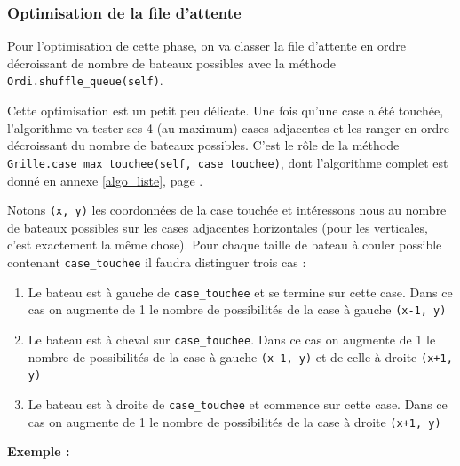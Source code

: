 \subsubsection{Optimisation de la file d'attente}

Pour l'optimisation de cette phase, on va classer la file d'attente en ordre décroissant de nombre de bateaux possibles avec la méthode \texttt{Ordi.shuffle\_queue(self)}.
 
Cette optimisation est un petit peu délicate. Une fois qu'une case a été touchée, l'algorithme va tester ses 4 (au maximum) cases adjacentes et les ranger en ordre décroissant du nombre de bateaux possibles. C'est le rôle de la méthode \texttt{Grille.case\_max\_touchee(self, case\_touchee)}, dont l'algorithme complet est donné en annexe \ref{algo_liste}, page \pageref{case_max_touchee}. 

\medskip

Notons \texttt{(x, y)} les coordonnées de la case touchée et intéressons nous au nombre de bateaux possibles sur les cases adjacentes horizontales (pour les verticales, c'est exactement la même chose). Pour chaque taille de bateau à couler possible contenant \texttt{case\_touchee} il faudra distinguer trois cas :
\begin{enumerate}
\item Le bateau est à gauche de \texttt{case\_touchee} et se termine sur cette case. Dans ce cas on augmente de 1 le nombre de possibilités de la case à gauche \texttt{(x-1, y)}
\item Le bateau est à cheval sur \texttt{case\_touchee}. Dans ce cas on augmente de 1 le nombre de possibilités de la case à gauche \texttt{(x-1, y)} et de celle à droite \texttt{(x+1, y)}
\item Le bateau est à droite de \texttt{case\_touchee} et commence sur cette case. Dans ce cas on augmente de 1 le nombre de possibilités de la case à droite \texttt{(x+1, y)}
\end{enumerate}
\newpage
\textbf{Exemple :}

